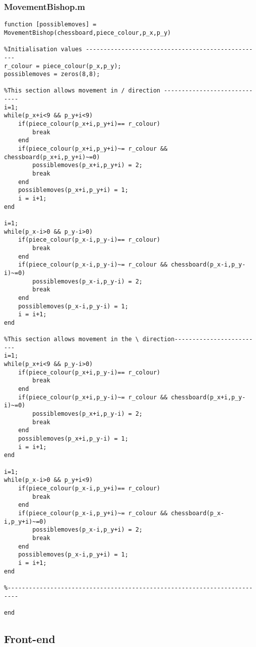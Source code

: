 \documentclass{article}
\begin{document}
\subsubsection{MovementBishop.m}
\begin{lstlisting}
function [possiblemoves] = MovementBishop(chessboard,piece_colour,p_x,p_y)

%Initialisation values --------------------------------------------------
r_colour = piece_colour(p_x,p_y);
possiblemoves = zeros(8,8);

%This section allows movement in / direction -----------------------------
i=1;
while(p_x+i<9 && p_y+i<9)
    if(piece_colour(p_x+i,p_y+i)== r_colour)
        break
    end
    if(piece_colour(p_x+i,p_y+i)~= r_colour && chessboard(p_x+i,p_y+i)~=0)
        possiblemoves(p_x+i,p_y+i) = 2;
        break
    end
    possiblemoves(p_x+i,p_y+i) = 1;
    i = i+1;
end

i=1;
while(p_x-i>0 && p_y-i>0)
    if(piece_colour(p_x-i,p_y-i)== r_colour)
        break
    end
    if(piece_colour(p_x-i,p_y-i)~= r_colour && chessboard(p_x-i,p_y-i)~=0)
        possiblemoves(p_x-i,p_y-i) = 2;
        break
    end
    possiblemoves(p_x-i,p_y-i) = 1;
    i = i+1;
end

%This section allows movement in the \ direction-------------------------
i=1;
while(p_x+i<9 && p_y-i>0)
    if(piece_colour(p_x+i,p_y-i)== r_colour)
        break
    end
    if(piece_colour(p_x+i,p_y-i)~= r_colour && chessboard(p_x+i,p_y-i)~=0)
        possiblemoves(p_x+i,p_y-i) = 2;
        break
    end
    possiblemoves(p_x+i,p_y-i) = 1;
    i = i+1;
end

i=1;
while(p_x-i>0 && p_y+i<9)
    if(piece_colour(p_x-i,p_y+i)== r_colour)
        break
    end
    if(piece_colour(p_x-i,p_y+i)~= r_colour && chessboard(p_x-i,p_y+i)~=0)
        possiblemoves(p_x-i,p_y+i) = 2;
        break
    end
    possiblemoves(p_x-i,p_y+i) = 1;
    i = i+1;
end

%-------------------------------------------------------------------------

end
\end{lstlisting}

\subsection{Front-end}
\end{document}
